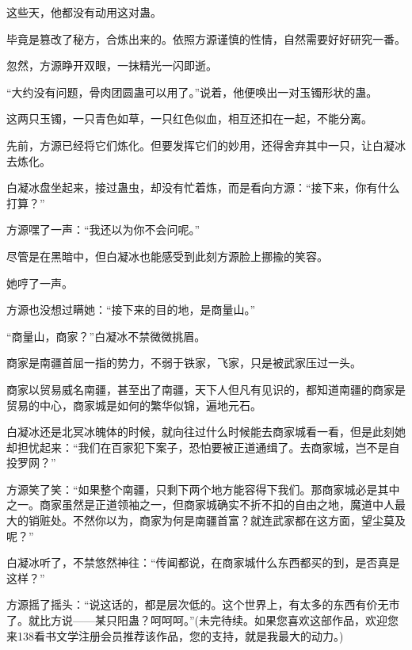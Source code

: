 \begin{this_body}
这些天，他都没有动用这对蛊。

毕竟是篡改了秘方，合炼出来的。依照方源谨慎的性情，自然需要好好研究一番。

忽然，方源睁开双眼，一抹精光一闪即逝。

“大约没有问题，骨肉团圆蛊可以用了。”说着，他便唤出一对玉镯形状的蛊。

这两只玉镯，一只青色如草，一只红色似血，相互还扣在一起，不能分离。

先前，方源已经将它们炼化。但要发挥它们的妙用，还得舍弃其中一只，让白凝冰去炼化。

白凝冰盘坐起来，接过蛊虫，却没有忙着炼，而是看向方源：“接下来，你有什么打算？”

方源嘿了一声：“我还以为你不会问呢。”

尽管是在黑暗中，但白凝冰也能感受到此刻方源脸上挪揄的笑容。

她哼了一声。

方源也没想过瞒她：“接下来的目的地，是商量山。”

“商量山，商家？”白凝冰不禁微微挑眉。

商家是南疆首屈一指的势力，不弱于铁家，飞家，只是被武家压过一头。

商家以贸易威名南疆，甚至出了南疆，天下人但凡有见识的，都知道南疆的商家是贸易的中心，商家城是如何的繁华似锦，遍地元石。

白凝冰还是北冥冰魄体的时候，就向往过什么时候能去商家城看一看，但是此刻她却担忧起来：“我们在百家犯下案子，恐怕要被正道通缉了。去商家城，岂不是自投罗网？”

方源笑了笑：“如果整个南疆，只剩下两个地方能容得下我们。那商家城必是其中之一。商家虽然是正道领袖之一，但商家城确实不折不扣的自由之地，魔道中人最大的销赃处。不然你以为，商家为何是南疆首富？就连武家都在这方面，望尘莫及呢？”

白凝冰听了，不禁悠然神往：“传闻都说，在商家城什么东西都买的到，是否真是这样？”

方源摇了摇头：“说这话的，都是层次低的。这个世界上，有太多的东西有价无市了。就比方说——某只阳蛊？呵呵呵。”(未完待续。如果您喜欢这部作品，欢迎您来138看书文学注册会员推荐该作品，您的支持，就是我最大的动力。)

\end{this_body}

